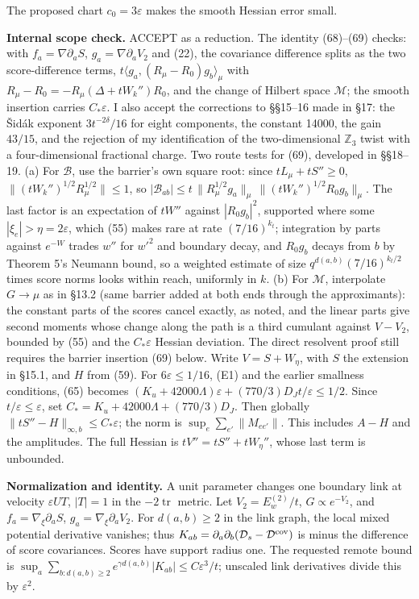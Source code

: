 \documentclass[11pt,a4paper]{article}
\begin{document}
The proposed chart \(c_0=3\varepsilon\) makes the smooth Hessian error
small.

\textbf{Internal scope check.} ACCEPT as a reduction. The identity
(68)--(69) checks: with \(f_a=\nabla\partial_aS\),
\(g_a=\nabla\partial_aV_2\) and (22), the covariance difference splits
as the two score-difference terms,
\(t\langle g_a,(R_\mu-R_0)g_b\rangle_\mu\) with
\(R_\mu-R_0=-R_\mu(\Delta+tW_k'')R_0\), and the change of Hilbert space
\(\mathcal M\); the smooth insertion carries \(C_*\varepsilon\). I also
accept the corrections to §§15--16 made in §17: the Šidák exponent
\(3t^{-2\delta}/16\) for eight components, the constant 14000, the gain
\(43/15\), and the rejection of my identification of the two-dimensional
\(\mathbb Z_3\) twist with a four-dimensional fractional charge. Two
route tests for (69), developed in §§18--19. (a) For \(\mathcal B\), use
the barrier's own square root: since \(tL_\mu+tS''\ge0\),
\(\|(tW_k'')^{1/2}R_\mu^{1/2}\|\le1\), so
\(|\mathcal B_{ab}|\le t\,\|R_\mu^{1/2}g_a\|_\mu\,\|(tW_k'')^{1/2}R_0g_b\|_\mu\).
The last factor is an expectation of \(tW''\) against \(|R_0g_b|^2\),
supported where some \(|\xi_e|>\eta=2\varepsilon\), which (55) makes
rare at rate \((7/16)^{k_t}\); integration by parts against \(e^{-W}\)
trades \(w''\) for \(w'^2\) and boundary decay, and \(R_0g_b\) decays
from \(b\) by Theorem 5's Neumann bound, so a weighted estimate of size
\(q^{d(a,b)}(7/16)^{k_t/2}\) times score norms looks within reach,
uniformly in \(k\). (b) For \(\mathcal M\), interpolate \(G\to\mu\) as
in §13.2 (same barrier added at both ends through the approximants): the
constant parts of the scores cancel exactly, as noted, and the linear
parts give second moments whose change along the path is a third
cumulant against \(V-V_2\), bounded by (55) and the \(C_*\varepsilon\)
Hessian deviation. The direct resolvent proof still requires the barrier
insertion (69) below. Write \(V=S+W_\eta\), with \(S\) the extension in
§15.1, and \(H\) from (59). For \(6\varepsilon\le1/16\), (E1) and the
earlier smallness conditions, (65) becomes
\((K_u+42000\Lambda)\varepsilon+(770/3)D_Jt/\varepsilon\le1/2\). Since
\(t/\varepsilon\le\varepsilon\), set
\(C_* =K_u+42000\Lambda+(770/3)D_J\). Then globally
\(\|tS''-H\|_{\infty,b}\le C_*\varepsilon\); the norm is
\(\sup_e\sum_{e'}\|M_{ee'}\|\). This includes \(A-H\) and the
amplitudes. The full Hessian is \(tV''=tS''+tW_\eta''\), whose last term
is unbounded.

\textbf{Normalization and identity.} A unit parameter changes one
boundary link at velocity \(\varepsilon UT\), \(|T|=1\) in the
\(-2\operatorname{tr}\) metric. Let \(V_2=E_w^{(2)}/t\),
\(G\propto e^{-V_2}\), and \(f_a=\nabla_\xi\partial_a S\),
\(g_a=\nabla_\xi\partial_a V_2\). For \(d(a,b)\ge2\) in the link graph,
the local mixed potential derivative vanishes; thus
\(K_{ab}=\partial_a\partial_b(\mathcal D_s-\mathcal D^{\rm cov})\) is
minus the difference of score covariances. Scores have support radius
one. The requested remote bound is
\(\sup_a\sum_{b:d(a,b)\ge2}e^{\gamma d(a,b)}|K_{ab}|\le C\varepsilon^3/t\);
unscaled link derivatives divide this by \(\varepsilon^2\).
\end{document}
